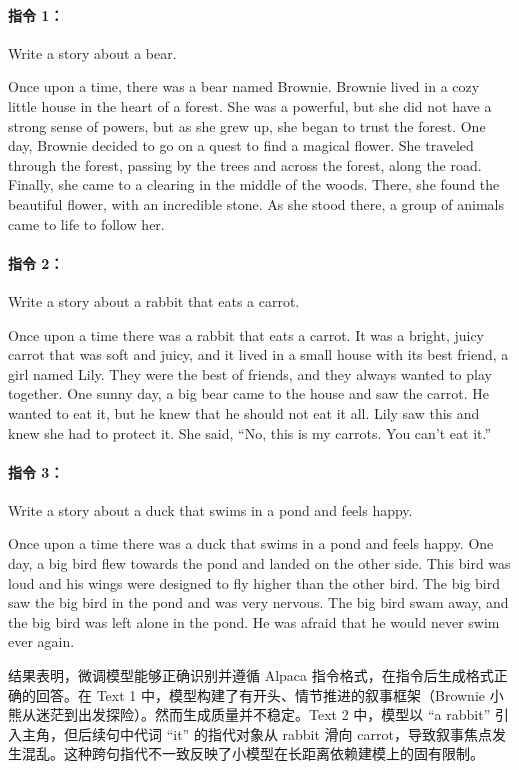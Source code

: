 \documentclass{article}
\begin{document}
\paragraph{指令 1：} Write a story about a bear.\

Once upon a time, there was a bear named Brownie. Brownie lived in a cozy little house in the heart of a forest. She was a powerful, but she did not have a strong sense of powers, but as she grew up, she began to trust the forest. One day, Brownie decided to go on a quest to find a magical flower. She traveled through the forest, passing by the trees and across the forest, along the road. Finally, she came to a clearing in the middle of the woods. There, she found the beautiful flower, with an incredible stone. As she stood there, a group of animals came to life to follow her.

\paragraph{指令 2：} Write a story about a rabbit that eats a carrot.\

Once upon a time there was a rabbit that eats a carrot. It was a bright, juicy carrot that was soft and juicy, and it lived in a small house with its best friend, a girl named Lily. They were the best of friends, and they always wanted to play together. One sunny day, a big bear came to the house and saw the carrot. He wanted to eat it, but he knew that he should not eat it all. Lily saw this and knew she had to protect it. She said, ``No, this is my carrots. You can't eat it.''

\paragraph{指令 3：} Write a story about a duck that swims in a pond and feels happy.\

Once upon a time there was a duck that swims in a pond and feels happy. One day, a big bird flew towards the pond and landed on the other side. This bird was loud and his wings were designed to fly higher than the other bird. The big bird saw the big bird in the pond and was very nervous. The big bird swam away, and the big bird was left alone in the pond. He was afraid that he would never swim ever again.

结果表明，微调模型能够正确识别并遵循 Alpaca 指令格式，在指令后生成格式正确的回答。在 Text 1 中，模型构建了有开头、情节推进的叙事框架（Brownie 小熊从迷茫到出发探险）。然而生成质量并不稳定。Text 2 中，模型以 ``a rabbit'' 引入主角，但后续句中代词 ``it'' 的指代对象从 rabbit 滑向 carrot，导致叙事焦点发生混乱。这种跨句指代不一致反映了小模型在长距离依赖建模上的固有限制。
\end{document}
